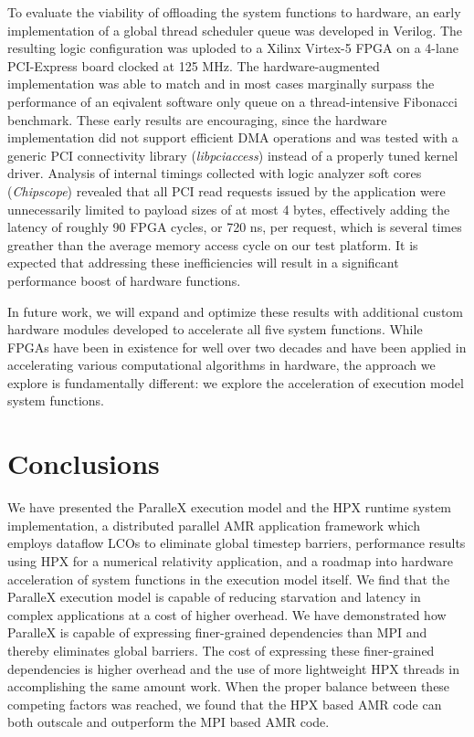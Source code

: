 \documentclass{revtex4}
\begin{document}
To evaluate the viability of offloading the system functions to hardware,
an early implementation of a global thread scheduler queue was developed in
Verilog.
The resulting logic configuration was uploded to a Xilinx Virtex-5 FPGA 
on a 4-lane PCI-Express board clocked at 125 MHz. 
The hardware-augmented implementation was able to match and in most cases 
marginally surpass the performance of an eqivalent software only queue 
on a thread-intensive Fibonacci benchmark.
These early results are encouraging, since the hardware implementation 
did not support efficient DMA operations and was tested with a generic 
PCI connectivity library ({\it libpciaccess}) instead of a properly tuned 
kernel driver.
Analysis of internal timings collected with logic analyzer soft cores
({\it Chipscope}) revealed that all PCI read requests issued by the 
application were unnecessarily limited to payload sizes of at most 4 bytes,
effectively adding the latency of roughly 90 FPGA cycles, or 720 ns, per 
request, which is several times greather than the average memory access
cycle on our test platform.
It is expected that addressing these inefficiencies will result in a
significant performance boost of hardware functions.

In future work, we will expand and optimize these results with additional 
custom hardware modules developed to accelerate all five system functions.   
While FPGAs have been in existence for well over
two decades and have been applied in accelerating various computational algorithms in 
hardware, the approach we explore is fundamentally different:  we explore the acceleration
of execution model system functions.

\section{Conclusions}
\label{sec:conlusions}

We have presented the ParalleX execution model and the HPX runtime system implementation, 
a distributed parallel AMR application framework which employs dataflow LCOs to eliminate global timestep barriers, 
performance results using HPX for a numerical relativity application,
and a roadmap into hardware acceleration of system functions in the execution model itself.
We find that the ParalleX execution model is capable of reducing starvation and latency in complex applications
at a cost of higher overhead.  We have demonstrated how ParalleX is capable of expressing finer-grained 
dependencies than MPI and thereby eliminates global barriers.  The cost of expressing these finer-grained
dependencies is higher overhead and the use of more lightweight HPX threads in accomplishing the same amount work.  
When the proper balance between these competing factors was reached,
we found that the HPX based AMR code can both outscale and outperform the MPI based AMR code. 
\end{document}
